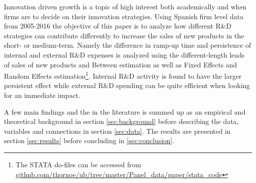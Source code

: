 \label{sec:intro}
Innovation driven growth is a topic of high interest both academically and when firms are to decide on their innovation strategies. Using Spanish firm level data from 2005-2016 the objective of this paper is to analyze how different R\&D strategies can contribute differently to increase the sales of new products in the short- or medium-term. Namely the difference in ramp-up time and persistence of internal and external R\&D expenses is analyzed using the different-length leads of sales of new products and Between estimation as well as Fixed Effects and Random Effects estimation\footnote{The STATA do-files can be accessed from \href{https://github.com/thornoe/ub/tree/master/Panel_data/paper/stata_code}{github.com/thornoe/ub/tree/master/Panel\_data/paper/stata\_code}}. Internal R\&D activity is found to have the larger persistent effect while external R\&D spending can be quite efficient when looking for an immediate impact.

A few main findings and the in the literature is summed up as an empirical and theoretical background in section \ref{sec:background} before describing the data, variables and connections in section \ref{sec:data}. The results are presented in section \ref{sec:results} before concluding in \ref{sec:conclusion}.
